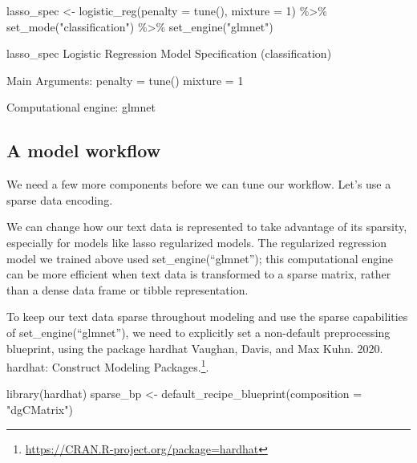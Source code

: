 \documentclass[
]{article}
\newenvironment{Shaded}{}{}
\newcommand{\AttributeTok}[1]{\textcolor[rgb]{0.49,0.56,0.16}{#1}}
\newcommand{\DecValTok}[1]{\textcolor[rgb]{0.25,0.63,0.44}{#1}}
\newcommand{\FunctionTok}[1]{\textcolor[rgb]{0.02,0.16,0.49}{#1}}
\newcommand{\NormalTok}[1]{#1}
\newcommand{\OtherTok}[1]{\textcolor[rgb]{0.00,0.44,0.13}{#1}}
\newcommand{\SpecialCharTok}[1]{\textcolor[rgb]{0.25,0.44,0.63}{#1}}
\newcommand{\StringTok}[1]{\textcolor[rgb]{0.25,0.44,0.63}{#1}}
\DeclareRobustCommand{\href}[2]{#2\footnote{\url{#1}}}
\begin{document}
\begin{Shaded}
\begin{Highlighting}[]
\NormalTok{lasso\_spec }\OtherTok{\textless{}{-}} \FunctionTok{logistic\_reg}\NormalTok{(}\AttributeTok{penalty =} \FunctionTok{tune}\NormalTok{(), }\AttributeTok{mixture =} \DecValTok{1}\NormalTok{) }\SpecialCharTok{\%\textgreater{}\%}
    \FunctionTok{set\_mode}\NormalTok{(}\StringTok{"classification"}\NormalTok{) }\SpecialCharTok{\%\textgreater{}\%}
    \FunctionTok{set\_engine}\NormalTok{(}\StringTok{"glmnet"}\NormalTok{)}

\NormalTok{lasso\_spec}
\NormalTok{Logistic Regression Model }\FunctionTok{Specification}\NormalTok{ (classification)}

\NormalTok{Main Arguments}\SpecialCharTok{:}
\NormalTok{  penalty }\OtherTok{=} \FunctionTok{tune}\NormalTok{()}
\NormalTok{  mixture }\OtherTok{=} \DecValTok{1}

\NormalTok{Computational engine}\SpecialCharTok{:}\NormalTok{ glmnet }
\end{Highlighting}
\end{Shaded}

\hypertarget{a-model-workflow}{%
\subsection{A model workflow}\label{a-model-workflow}}

We need a few more components before we can tune our workflow. Let's use
a sparse data encoding.

We can change how our text data is represented to take advantage of its
sparsity, especially for models like lasso regularized models. The
regularized regression model we trained above used
set\_engine(``glmnet''); this computational engine can be more efficient
when text data is transformed to a sparse matrix, rather than a dense
data frame or tibble representation.

To keep our text data sparse throughout modeling and use the sparse
capabilities of set\_engine(``glmnet''), we need to explicitly set a
non-default preprocessing blueprint, using the package hardhat
\href{https://CRAN.R-project.org/package=hardhat}{Vaughan, Davis, and
Max Kuhn. 2020. hardhat: Construct Modeling Packages.}.

\begin{Shaded}
\begin{Highlighting}[]
\FunctionTok{library}\NormalTok{(hardhat)}
\NormalTok{sparse\_bp }\OtherTok{\textless{}{-}} \FunctionTok{default\_recipe\_blueprint}\NormalTok{(}\AttributeTok{composition =} \StringTok{"dgCMatrix"}\NormalTok{)}
\end{Highlighting}
\end{Shaded}
\end{document}
